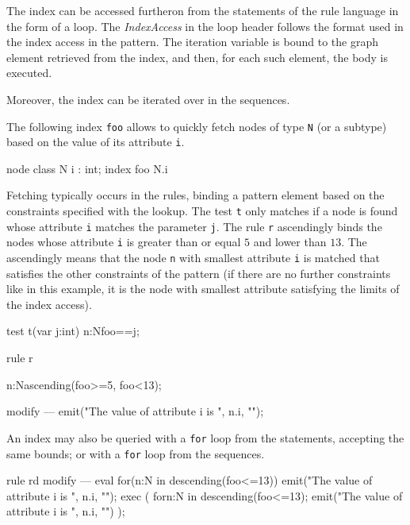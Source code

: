 The index can be accessed furtheron from the statements of the rule language in the form of a loop.
The \emph{IndexAccess} in the loop header follows the format used in the index access in the pattern.
The iteration variable is bound to the graph element retrieved from the index, and then, for each such element, the body is executed.

Moreover, the index can be iterated over in the sequences.

\begin{example}
The following index \texttt{foo} allows to quickly fetch nodes of type \texttt{N} (or a subtype) based on the value of its attribute \texttt{i}.

\begin{grgen}
node class N {
  i : int;
}
index foo { N.i }
\end{grgen}

Fetching typically occurs in the rules, binding a pattern element based on the constraints specified with the lookup.
The test \texttt{t} only matches if a node is found whose attribute \texttt{i} matches the parameter \texttt{j}.
The rule \texttt{r} ascendingly binds the nodes whose attribute \texttt{i} is greater than or equal $5$ and lower than $13$.
The ascendingly means that the node \texttt{n} with smallest attribute \texttt{i} is matched that satisfies the other constraints of the pattern (if there are no further constraints like in this example, it is the node with smallest attribute satisfying the limits of the index access).

\begin{grgen}
test t(var j:int) {
  n:N{foo==j};	
}

rule r {
  n:N{ascending(foo>=5, foo<13)};

  modify {
  ---
    emit("The value of attribute i is ", n.i, "\n");
  }
}
\end{grgen}

An index may also be queried with a \texttt{for} loop from the statements, accepting the same bounds; 
or with a \texttt{for} loop from the sequences.

\begin{grgen}
rule rd {
  modify {
  ---
    eval {
      for(n:N in {descending(foo<=13)}) {
        emit("The value of attribute i is ", n.i, "\n");
      }
    }
    exec (
      for{n:N in {descending(foo<=13)}; {emit("The value of attribute i is ", n.i, "\n")} }
    );
  }
}
\end{grgen}

\end{example}

